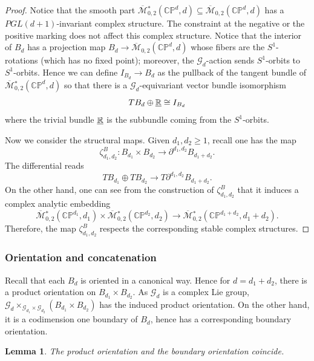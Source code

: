 \documentclass[reqno, 10pt]{amsart}
\numberwithin{equation}{section}
\numberwithin{equation}{section}
\renewcommand{\subset}{\subseteq}
\newtheorem{lemma}[thm]{Lemma}
\theoremstyle{definition}
\theoremstyle{remark}
\newcommand{\beqn}{\begin{equation*}}
\newcommand{\eeqn}{\end{equation*}}
\newcommand{\ov}{\overline}
\newcommand{\mb}{\mathbb}
\newcommand{\mc}{\mathcal}
\newcommand{\uds}[1]{\underline{\smash{#1}}}
\begin{document}
\begin{proof}
Notice that the smooth part $\ov{\mc M}{}_{0,2}^* (\mb{CP}^d, d) \subset \ov{\mc M}{}_{0,2}(\mb{CP}^d, d)$ has a $PGL(d+1)$-invariant complex structure. The constraint at the negative or the positive marking does not affect this complex structure. Notice that the interior of $B_d$ has a projection map $B_d \to \ov{\mc M}{}_{0,2}(\mb{CP}^d, d)$ whose fibers are the $S^1$-rotations (which has no fixed point); moreover, the ${\mc G}_d$-action sends $S^1$-orbits to $S^1$-orbits. Hence we can define $I_{B_d} \to B_d$ as the pullback of the tangent bundle of $\ov{\mc M}{}_{0,2}^* (\mb{CP}^d, d)$ so that there is a ${\mc G}_d$-equivariant vector bundle isomorphism
\beqn
TB_d \oplus \uds{\mb R} \cong I_{B_d}
\eeqn
where the trivial bundle $\uds {\mb R}$ is the subbundle coming from the $S^1$-orbits. 

Now we consider the structural maps. Given $d_1, d_2\geq 1$, recall one has the map
\beqn
\zeta_{d_1, d_2}^B: B_{d_1} \times B_{d_2} \to \partial^{d_1, d_2} B_{d_1 + d_2}.
\eeqn
The differential reads 
\beqn
TB_{d_1} \oplus TB_{d_2} \to T \partial^{d_1, d_2} B_{d_1 + d_2}.
\eeqn
On the other hand, one can see from the construction of $\zeta_{d_1, d_2}^B$ that it induces a complex analytic embedding
\beqn
\ov{\mc M}{}_{0,2}^*(\mb{CP}^{d_1}, d_1) \times \ov{\mc M}{}_{0,2}^*(\mb{CP}^{d_2}, d_2) \to \ov{\mc M}{}_{0,2}^* (\mb{CP}^{d_1 + d_2}, d_1 + d_2).
\eeqn
Therefore, the map $\zeta_{d_1, d_2}^B$ respects the corresponding stable complex structures.
\end{proof}


\subsubsection{Orientation and concatenation}

Recall that each $B_d$ is oriented in a canonical way. Hence for $d = d_1 + d_2$, there is a product orientation on $B_{d_1} \times B_{d_2}$. As ${\mc G}_d$ is a complex Lie group, ${\mc G}_d\times_{{\mc G}_{d_1}\times {\mc G}_{d_2}} (B_{d_1}\times B_{d_2})$ has the induced product orientation. On the other hand, it is a codimension one boundary of $B_d$, hence has a corresponding boundary orientation.


\begin{lemma}\label{lemma_domain_orientation}
The product orientation and the boundary orientation coincide.
\end{lemma}
\end{document}
